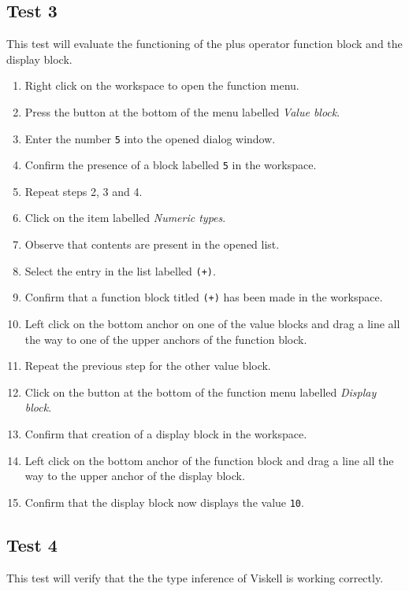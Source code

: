 	\subsection{Test 3}
		This test will evaluate the functioning of the plus operator function block and the display block.
		
		\begin{enumerate}
			\item Right click on the workspace to open the function menu.
			\item Press the button at the bottom of the menu labelled \emph{Value block}.
			\item Enter the number \texttt{5} into the opened dialog window.
			\item Confirm the presence of a block labelled \texttt{5} in the workspace.
			\item Repeat steps 2, 3 and 4.
			\item Click on the item labelled \emph{Numeric types}.
			\item Observe that contents are present in the opened list.
			\item Select the entry in the list labelled \texttt{(+)}.
			\item Confirm that a function block titled \texttt{(+)} has been made in the workspace.
			\item Left click on the bottom anchor on one of the value blocks and drag a line all the way to one of the upper anchors of the function block.
			\item Repeat the previous step for the other value block.
			\item Click on the button at the bottom of the function menu labelled \emph{Display block}.
			\item Confirm that creation of a display block in the workspace.
			\item Left click on the bottom anchor of the function block and drag a line all the way to the upper anchor of the display block.
			\item Confirm that the display block now displays the value \texttt{10}.
		\end{enumerate}
		
	\subsection{Test 4}
		This test will verify that the the type inference of Viskell is working correctly.
		
